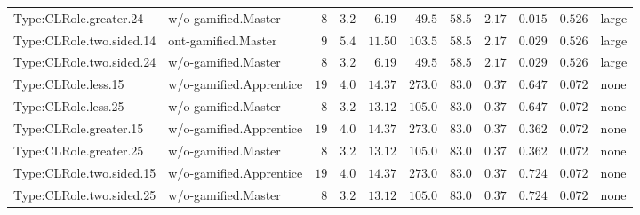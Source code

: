 \documentclass[6pt,a4paper]{article}
\begin{document}
{\begin{longtable}{llrrrrrrrrl}
Type:CLRole.greater.24&w/o-gamified.Master&$ 8$&$3.2$&$ 6.19$&$ 49.5$&$ 58.5$&$ 2.17$&$0.015$&$0.526$&large\tabularnewline
Type:CLRole.two.sided.14&ont-gamified.Master&$ 9$&$5.4$&$11.50$&$103.5$&$ 58.5$&$ 2.17$&$0.029$&$0.526$&large\tabularnewline
Type:CLRole.two.sided.24&w/o-gamified.Master&$ 8$&$3.2$&$ 6.19$&$ 49.5$&$ 58.5$&$ 2.17$&$0.029$&$0.526$&large\tabularnewline
Type:CLRole.less.15&w/o-gamified.Apprentice&$19$&$4.0$&$14.37$&$273.0$&$ 83.0$&$ 0.37$&$0.647$&$0.072$&none\tabularnewline
Type:CLRole.less.25&w/o-gamified.Master&$ 8$&$3.2$&$13.12$&$105.0$&$ 83.0$&$ 0.37$&$0.647$&$0.072$&none\tabularnewline
Type:CLRole.greater.15&w/o-gamified.Apprentice&$19$&$4.0$&$14.37$&$273.0$&$ 83.0$&$ 0.37$&$0.362$&$0.072$&none\tabularnewline
Type:CLRole.greater.25&w/o-gamified.Master&$ 8$&$3.2$&$13.12$&$105.0$&$ 83.0$&$ 0.37$&$0.362$&$0.072$&none\tabularnewline
\newpage
Type:CLRole.two.sided.15&w/o-gamified.Apprentice&$19$&$4.0$&$14.37$&$273.0$&$ 83.0$&$ 0.37$&$0.724$&$0.072$&none\tabularnewline
Type:CLRole.two.sided.25&w/o-gamified.Master&$ 8$&$3.2$&$13.12$&$105.0$&$ 83.0$&$ 0.37$&$0.724$&$0.072$&none\tabularnewline
\hline
\end{longtable}}
\end{document}
